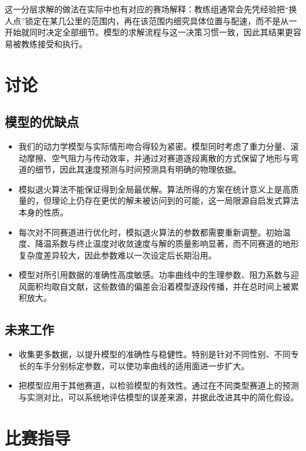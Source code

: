 \documentclass[11pt,a4paper]{ctexart}
\begin{document}
这一分层求解的做法在实际中也有对应的赛场解释：教练组通常会先凭经验把“换人点”锁定在某几公里的范围内，再在该范围内细究具体位置与配速，而不是从一开始就同时决定全部细节。模型的求解流程与这一决策习惯一致，因此其结果更容易被教练接受和执行。

\section{讨论}

\subsection{模型的优缺点}

\begin{itemize}
\item 我们的动力学模型与实际情形吻合得较为紧密。模型同时考虑了重力分量、滚动摩擦、空气阻力与传动效率，并通过对赛道逐段离散的方式保留了地形与弯道的细节，因此其速度预测与时间预测具有明确的物理依据。
\item 模拟退火算法不能保证得到全局最优解。算法所得的方案在统计意义上是高质量的，但理论上仍存在更优的解未被访问到的可能，这一局限源自启发式算法本身的性质。
\item 每次对不同赛道进行优化时，模拟退火算法的参数都需要重新调整。初始温度、降温系数与终止温度对收敛速度与解的质量影响显著，而不同赛道的地形复杂度差异较大，因此参数难以一次设定后长期沿用。
\item 模型对所引用数据的准确性高度敏感。功率曲线中的生理参数、阻力系数与迎风面积均取自文献，这些数值的偏差会沿着模型逐段传播，并在总时间上被累积放大。
\end{itemize}

\subsection{未来工作}

\begin{itemize}
\item 收集更多数据，以提升模型的准确性与稳健性。特别是针对不同性别、不同专长的车手分别标定参数，可以使功率曲线的适用面进一步扩大。
\item 把模型应用于其他赛道，以检验模型的有效性。通过在不同类型赛道上的预测与实测对比，可以系统地评估模型的误差来源，并据此改进其中的简化假设。
\end{itemize}

\section{比赛指导}
\end{document}
